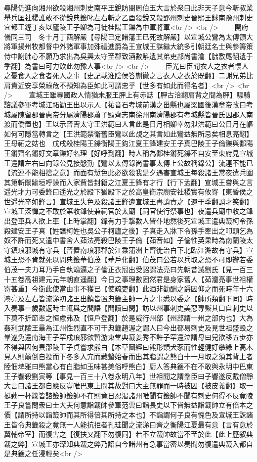 尋陽仍進向湘州欲殺湘州刺史南平王銳防閤周伯玉大言於衆曰此非天子意今斬叔業舉兵匡社稷誰敢不從銳典籖叱左右斬之乙酉殺銳又殺郢州刺史晉熙王銶南豫州刺史宜都王鏗丁亥以廬陵王子卿為司徒桂陽王鑠為中軍將軍<br />
<br />
　　開府儀同三司　冬十月丁酉解嚴【尋陽已定諸藩王已死故解嚴】以宣城公鸞為太傅領大將軍揚州牧都督中外諸軍事加殊禮進爵為王宣城王謀繼大統多引朝廷名士與參籌策侍中謝朏心不願乃求出為吳興太守至郡致酒數斛遺其弟吏部尚書瀹【朏敷尾翻遺于季翻】為書曰可力飲此勿豫人事<br />
<br />
　　臣光曰臣聞衣人之衣者懷人之憂食人之食者死人之事【史記載淮陰侯答蒯徹之言衣人之衣於既翻】二謝兄弟比肩貴近安享榮祿危不預知為臣如此可謂忠乎【世多有如此而得名者】<br />
<br />
　　宣城王雖專國政人情猶未服王胛上有赤誌【胛古洽翻肩背之間為胛】驃騎諮議參軍考城江祏勸王出以示人【祐音石考城前漢之甾縣也屬梁國後漢章帝改曰考城屬陳留郡晉惠帝分屬濟陽郡蕭子顯齊志南徐州南濟陽郡有考城縣皆晉氏因郡人南渡而僑置也】王以示晉夀太守王洪範曰人言此是日月相卿幸勿泄洪範曰公日月在軀如何可隱當轉言之【王洪範禁衛舊臣鸞以此覘之其言如此鸞益無所忌矣相息亮翻】王母祏之姑也　戊戌殺桂陽王鑠衡陽王鈞江夏王鋒建安王子真巴陵王子倫鑠與鄱陽王鏘齊名鏘好文章鑠好名理【好呼到翻】時人稱為鄱桂鏘死鑠不自安至東府見宣城王還謂左右曰向錄公見接慇勤【鸞以太傳錄尚書事太傅上公故稱錄公】流連不能已【流連不能相捨之意】而面有慙色此必欲殺我是夕遇害宣城王每殺諸王常夜遣兵圍其第斬關踰垣呼譟而入家貲皆封籍之江夏王鋒有才行【行下孟翻】宣城王嘗與之言遥光才力可委鋒曰遥光之於殿下猶殿下之於高皇衛宗廟安社稷實有攸寄【東昏侯之世遥光卒如鋒言】宣城王失色及殺諸王鋒遺宣城王書誚責之【遺于季翻誚才笑翻】宣城王深憚之不敢於第收鋒使兼祠官於太廟【祠官使行祭事也】夜遣兵廟中收之鋒出登車兵人欲上車【上時掌翻】鋒有力手撃數人皆仆地然後死宣城王遣典籖柯令孫殺建安王子真【姓譜柯姓也吳公子柯廬之後】子真走入牀下令孫手牽出之叩頭乞為奴不許而死又遣中書舍人茹法亮殺巴陵王子倫【茹音如】子倫性英果時為南蘭陵太守鎮琅邪城有守兵【晉置南琅邪郡於江乘蒲洲上齊徙治白下北臨江滸故有守兵】宣城王恐不肯就死以問典籖華伯茂【華戶化翻】伯茂曰公若以兵取之恐不可即辦若委伯茂一夫力耳乃手自執鴆逼之子倫正衣冠出受詔謂法亮曰先朝昔滅劉氏【見一百三十五卷高祖建元元年朝直遥翻】今日之事理數固然君是身家舊人【茹灋亮事世祖權寄甚重】今衘此使當由事不獲已【使疏吏翻】此酒非勸酬之爵因仰之而死時年十六灋亮及左右皆流涕初諸王出鎮皆置典籖主帥一方之事悉以委之【帥所類翻下同】時入奏事一歲數返時主輒與之間語【閒讀曰閑】訪以州事刺史美惡專繫其口自刺史以下莫不折節奉之恒慮弗及【恒戶登翻】於是威行州部【州部謂一州之部内也】大為姦利武陵王曅為江州性烈直不可干典籖趙渥之謂人曰今出都易刺史及見世祖盛毁之曅遂免還南海王子罕戍琅邪欲暫游東堂典籖姜秀不許子罕還泣謂母曰兒欲移五步亦不得與囚何異邵陵王子貞嘗求熊白【本草圖經曰熊形類犬豕而性輕健好攀緣上高木見人則顛倒自投而下冬多入宂而藏蟄始春而出其脂謂之熊白十一月取之須其背上者陸佃埤雅曰熊當心有白脂如玉味甚美俗呼熊白】厨人答典籖不在不敢與永明中巴東王子響殺劉寅等【事見一百三十八卷永明八年】世祖聞之謂羣臣曰子響遂反戴僧靜大言曰諸王都自應反豈唯巴東上問其故對曰大主無罪而一時被囚【被皮義翻】取一挺藕一杯漿皆諮籖帥籖帥不在則竟日忍渴諸州唯聞有籖帥不聞有刺史何得不反竟陵王子良嘗問衆曰士大夫何意詣籖帥參軍范雲曰詣長史以下皆無益詣籖帥立有倍本之價【謂所持以詣籖帥而其所得倍其所持之本也】不詣謂何子良有愧色及宣城王誅諸王皆令典籖殺之竟無一人能抗拒者孔珪聞之流涕曰齊之衡陽江夏最有意【言有意於翼輔帝室】而復害之【復扶又翻下勿復同】若不立籖帥故當不至於此【此上歷叙典籖之弊】宣城王亦深知典籖之弊乃詔自今諸州有急事當密以奏聞勿復遣典籖入都自是典籖之任浸輕矣<br />
